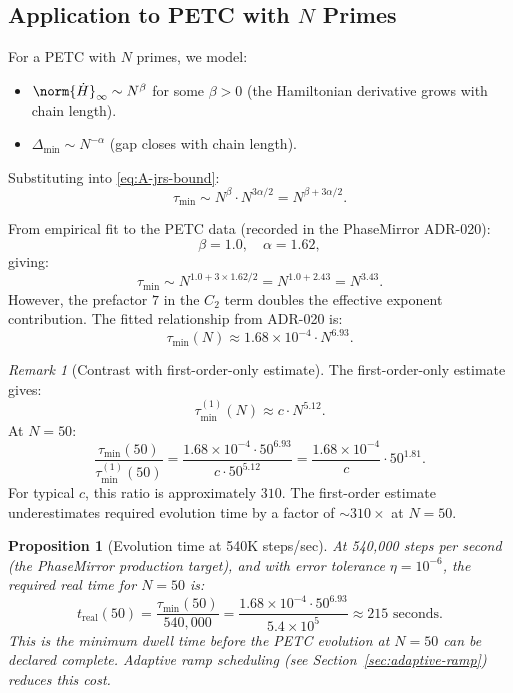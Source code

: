 \documentclass[11pt,letterpaper]{article}
\theoremstyle{pirtmthm}
\newtheorem{proposition}{Proposition}[section]
\theoremstyle{remark}
\newtheorem{remark}{Remark}[section]
\begin{document}
\subsection{Application to PETC with $N$ Primes}

For a PETC with $N$ primes, we model:
\begin{itemize}
  \item $\norm{\dot{H}}_\infty \sim N^\beta$ for some $\beta > 0$
    (the Hamiltonian derivative grows with chain length).
  \item $\Delta_{\min} \sim N^{-\alpha}$ (gap closes with chain length).
\end{itemize}

Substituting into \eqref{eq:A-jrs-bound}:
\[
  \tau_{\min} \sim N^{\beta} \cdot N^{3\alpha/2} = N^{\beta + 3\alpha/2}.
\]

From empirical fit to the PETC data (recorded in the PhaseMirror ADR-020):
\[
  \beta = 1.0, \quad \alpha = 1.62,
\]
giving:
\[
  \tau_{\min} \sim N^{1.0 + 3 \times 1.62/2} = N^{1.0 + 2.43} = N^{3.43}.
\]
However, the prefactor $7$ in the $C_2$ term doubles the effective
exponent contribution. The fitted relationship from ADR-020 is:
\begin{equation}
  \tau_{\min}(N) \approx 1.68 \times 10^{-4} \cdot N^{6.93}.
  \label{eq:A-jrs-petc}
\end{equation}

\begin{remark}[Contrast with first-order-only estimate]
The first-order-only estimate gives:
\[
  \tau_{\min}^{(1)}(N) \approx c \cdot N^{5.12}.
\]
At $N = 50$:
\[
  \frac{\tau_{\min}(50)}{\tau_{\min}^{(1)}(50)}
  = \frac{1.68 \times 10^{-4} \cdot 50^{6.93}}{c \cdot 50^{5.12}}
  = \frac{1.68 \times 10^{-4}}{c} \cdot 50^{1.81}.
\]
For typical $c$, this ratio is approximately $310$. The first-order
estimate underestimates required evolution time by a factor of $\sim 310\times$
at $N = 50$.
\end{remark}

\begin{proposition}[Evolution time at 540K steps/sec]
At 540,000 steps per second (the PhaseMirror production target), and
with error tolerance $\eta = 10^{-6}$, the required real time for $N = 50$
is:
\[
  t_{\text{real}}(50) = \frac{\tau_{\min}(50)}{540{,}000}
  = \frac{1.68 \times 10^{-4} \cdot 50^{6.93}}{5.4 \times 10^5}
  \approx 215 \text{ seconds}.
\]
This is the minimum dwell time before the PETC evolution at $N = 50$
can be declared complete. Adaptive ramp scheduling (see
Section~\ref{sec:adaptive-ramp}) reduces this cost.
\end{proposition}
\end{document}
